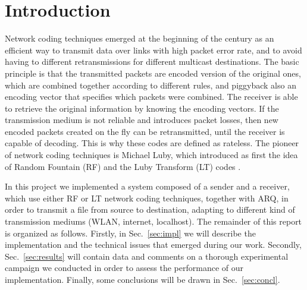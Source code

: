 \section{Introduction}
Network coding techniques emerged at the beginning of the century as an efficient way to transmit data over links with high packet error rate, and to avoid having to different retransmissions for different multicast destinations. The basic principle is that the transmitted packets are encoded version of the original ones, which are combined together according to different rules, and piggyback also an encoding vector that specifies which packets were combined. The receiver is able to retrieve the original information by knowing the encoding vectors. If the transmission medium is not reliable and introduces packet losses, then new encoded packets created on the fly can be retransmitted, until the receiver is capable of decoding. This is why these codes are defined as rateless. The pioneer of network coding techniques is Michael Luby, which introduced as first the idea of Random Fountain (RF) \cite{rf} and the Luby Transform (LT) codes \cite{lt}.

In this project we implemented a system composed of a sender and a receiver, which use either RF or LT network coding techniques, together with ARQ, in order to transmit a file from source to destination, adapting to different kind of transmission mediums (WLAN, internet, localhost). The remainder of this report is organized as follows. Firstly, in Sec.~\ref{sec:impl} we will describe the implementation and the technical issues that emerged during our work. Secondly, Sec.~\ref{sec:results} will contain data and comments on a thorough experimental campaign we conducted in order to assess the performance of our implementation. Finally, some conclusions will be drawn in Sec.~\ref{sec:concl}.
